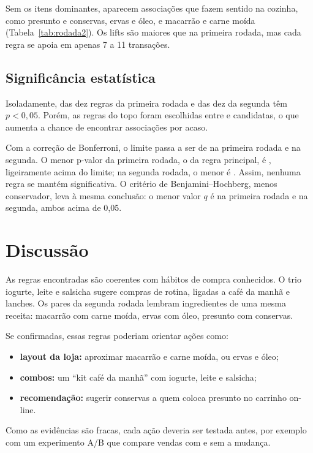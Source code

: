 \documentclass[11pt,a4paper]{article}
\begin{document}
Sem os itens dominantes, aparecem associações que fazem sentido na cozinha, como presunto e conservas, ervas e óleo, e macarrão e carne moída (Tabela~\ref{tab:rodada2}). Os lifts são maiores que na primeira rodada, mas cada regra se apoia em apenas 7 a 11 transações.

\begin{table}[H]
\centering
\caption{Rodada 2: as dez regras distintas de maior lift, sem os itens dominantes (suporte mínimo de 0,05\%).}
\label{tab:rodada2}
\small

\end{table}

\subsection{Significância estatística}

Isoladamente, \SigRUm{} das dez regras da primeira rodada e \SigRDois{} das dez da segunda têm $p < 0{,}05$. Porém, as regras do topo foram escolhidas entre \NumRegrasUnicasRUm{} e \NumRegrasUnicasRDois{} candidatas, o que aumenta a chance de encontrar associações por acaso.

Com a correção de Bonferroni, o limite passa a ser de \AlfaBonfRUm{} na primeira rodada e \AlfaBonfRDois{} na segunda. O menor p-valor da primeira rodada, o da regra principal, é \MenorPRUm{}, ligeiramente acima do limite; na segunda rodada, o menor é \MenorPRDois. Assim, nenhuma regra se mantém significativa. O critério de Benjamini--Hochberg, menos conservador, leva à mesma conclusão: o menor valor $q$ é \MenorQRUm{} na primeira rodada e \MenorQRDois{} na segunda, ambos acima de 0,05.

\section{Discussão}

As regras encontradas são coerentes com hábitos de compra conhecidos. O trio iogurte, leite e salsicha sugere compras de rotina, ligadas a café da manhã e lanches. Os pares da segunda rodada lembram ingredientes de uma mesma receita: macarrão com carne moída, ervas com óleo, presunto com conservas.

Se confirmadas, essas regras poderiam orientar ações como:
\begin{itemize}
  \item \textbf{layout da loja:} aproximar macarrão e carne moída, ou ervas e óleo;
  \item \textbf{combos:} um ``kit café da manhã'' com iogurte, leite e salsicha;
  \item \textbf{recomendação:} sugerir conservas a quem coloca presunto no carrinho on-line.
\end{itemize}
Como as evidências são fracas, cada ação deveria ser testada antes, por exemplo com um experimento A/B que compare vendas com e sem a mudança.
\end{document}
